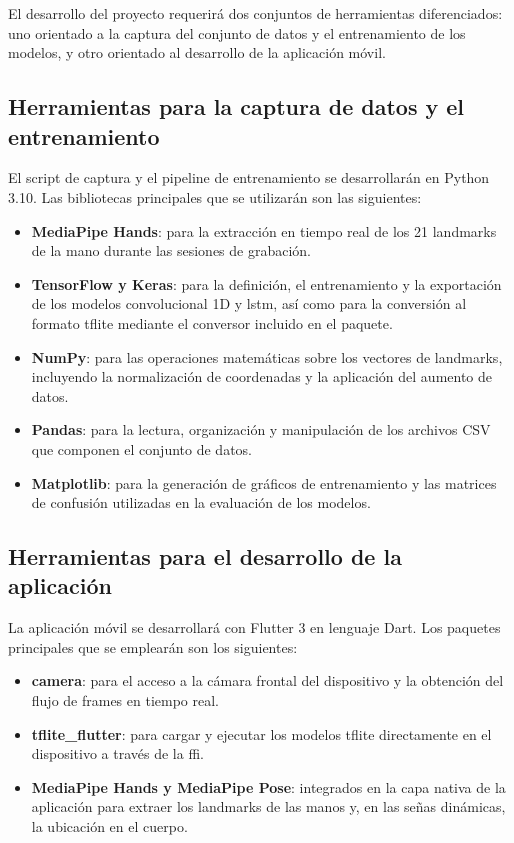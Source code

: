 El desarrollo del proyecto requerirá dos conjuntos de herramientas diferenciados: uno
orientado a la captura del conjunto de datos y el entrenamiento de los modelos, y otro
orientado al desarrollo de la aplicación móvil.

\subsection{Herramientas para la captura de datos y el entrenamiento}

El script de captura y el pipeline de entrenamiento se desarrollarán en Python 3.10.
Las bibliotecas principales que se utilizarán son las siguientes:

\begin{itemize}
    \item \textbf{MediaPipe Hands}: para la extracción en tiempo real de los 21
    landmarks de la mano durante las sesiones de grabación.
    \item \textbf{TensorFlow y Keras}: para la definición, el entrenamiento y la
    exportación de los modelos convolucional 1D y \acrshort{lstm}, así como para la conversión al
    formato \acrshort{tflite} mediante el conversor incluido en el paquete.
    \item \textbf{NumPy}: para las operaciones matemáticas sobre los vectores de
    landmarks, incluyendo la normalización de coordenadas y la aplicación del aumento
    de datos.
    \item \textbf{Pandas}: para la lectura, organización y manipulación de los
    archivos CSV que componen el conjunto de datos.
    \item \textbf{Matplotlib}: para la generación de gráficos de entrenamiento y
    las matrices de confusión utilizadas en la evaluación de los modelos.
\end{itemize}

\subsection{Herramientas para el desarrollo de la aplicación}

La aplicación móvil se desarrollará con Flutter 3 en lenguaje Dart. Los paquetes
principales que se emplearán son los siguientes:

\begin{itemize}
    \item \textbf{camera}: para el acceso a la cámara frontal del dispositivo y la
    obtención del flujo de frames en tiempo real.
    \item \textbf{tflite\_flutter}: para cargar y ejecutar los modelos \acrshort{tflite}
    directamente en el dispositivo a través de la \acrshort{ffi}.
    \item \textbf{MediaPipe Hands y MediaPipe Pose}: integrados en la capa nativa de la
    aplicación para extraer los landmarks de las manos y, en las señas dinámicas, la
    ubicación en el cuerpo.
\end{itemize}

